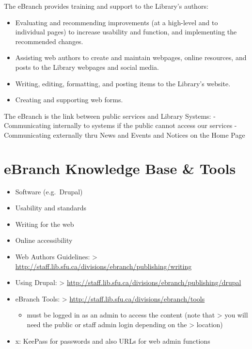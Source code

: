 \documentclass[
  openany]{book}
\providecommand{\tightlist}{%
  \setlength{\itemsep}{0pt}\setlength{\parskip}{0pt}}
\begin{document}
The eBranch provides training and support to the Library's authors:

\begin{itemize}
\tightlist
\item
  Evaluating and recommending improvements (at a high-level and to individual pages) to increase usability and function, and implementing the recommended changes.
\item
  Assisting web authors to create and maintain webpages, online resources, and posts to the Library webpages and social media.
\item
  Writing, editing, formatting, and posting items to the Library's website.
\item
  Creating and supporting web forms.
\end{itemize}

The eBranch is the link between public services and Library Systems:
- Communicating internally to systems if the public cannot access our services
- Communicating externally thru News and Events and Notices on the Home Page

\hypertarget{ebranch-knowledge-base-tools}{%
\chapter{eBranch Knowledge Base \& Tools}\label{ebranch-knowledge-base-tools}}

\begin{itemize}
\item
  Software (e.g.~Drupal)
\item
  Usability and standards
\item
  Writing for the web
\item
  Online accessibility
\item
  Web Authors Guidelines:
  \textgreater{} \href{http://staff.lib.sfu.ca/divisions/ebranch/publishing/writing}{{http://staff.lib.sfu.ca/divisions/ebranch/publishing/writing}}
\item
  Using Drupal:
  \textgreater{} \href{http://staff.lib.sfu.ca/divisions/ebranch/publishing/drupal}{{http://staff.lib.sfu.ca/divisions/ebranch/publishing/drupal}}
\item
  eBranch Tools:
  \textgreater{} \href{http://staff.lib.sfu.ca/divisions/ebranch/tools}{{http://staff.lib.sfu.ca/divisions/ebranch/tools}}

  \begin{itemize}
  \tightlist
  \item
    must be logged in as an admin to access the content (note that
    \textgreater{} you will need the public or staff admin login depending on the
    \textgreater{} location)
  \end{itemize}
\item
  x: KeePass for passwords and also URLs for web admin functions
\end{itemize}
\end{document}
